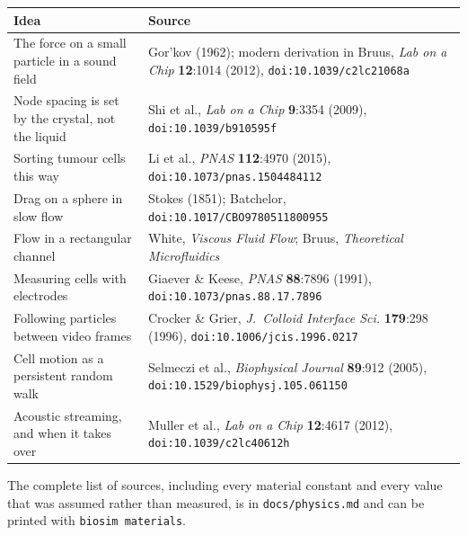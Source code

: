 \documentclass[11pt,a4paper]{article}
\begin{document}
\begin{center}\small
\begin{tabular}{p{5.0cm}p{9.5cm}}
\toprule
\textbf{Idea} & \textbf{Source} \\
\midrule
The force on a small particle in a sound field &
Gor'kov (1962); modern derivation in Bruus, \emph{Lab on a Chip} \textbf{12}:1014
(2012), \texttt{doi:10.1039/c2lc21068a} \\[4pt]
Node spacing is set by the crystal, not the liquid &
Shi et al., \emph{Lab on a Chip} \textbf{9}:3354 (2009),
\texttt{doi:10.1039/b910595f} \\[4pt]
Sorting tumour cells this way &
Li et al., \emph{PNAS} \textbf{112}:4970 (2015),
\texttt{doi:10.1073/pnas.1504484112} \\[4pt]
Drag on a sphere in slow flow &
Stokes (1851); Batchelor, \texttt{doi:10.1017/CBO9780511800955} \\[4pt]
Flow in a rectangular channel &
White, \emph{Viscous Fluid Flow}; Bruus, \emph{Theoretical Microfluidics} \\[4pt]
Measuring cells with electrodes &
Giaever \& Keese, \emph{PNAS} \textbf{88}:7896 (1991),
\texttt{doi:10.1073/pnas.88.17.7896} \\[4pt]
Following particles between video frames &
Crocker \& Grier, \emph{J.\ Colloid Interface Sci.} \textbf{179}:298 (1996),
\texttt{doi:10.1006/jcis.1996.0217} \\[4pt]
Cell motion as a persistent random walk &
Selmeczi et al., \emph{Biophysical Journal} \textbf{89}:912 (2005),
\texttt{doi:10.1529/biophysj.105.061150} \\[4pt]
Acoustic streaming, and when it takes over &
Muller et al., \emph{Lab on a Chip} \textbf{12}:4617 (2012),
\texttt{doi:10.1039/c2lc40612h} \\
\bottomrule
\end{tabular}
\end{center}

\vspace{1cm}
\begin{center}
\small\color{muted}
The complete list of sources, including every material constant and every value
that was assumed rather than measured, is in \texttt{docs/physics.md} and can be
printed with \texttt{biosim materials}.
\end{center}
\end{document}
